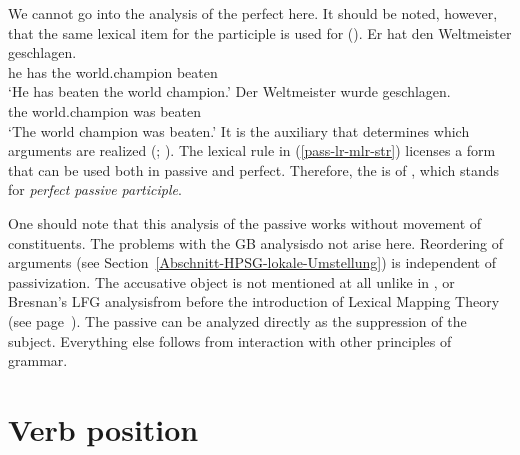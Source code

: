 We cannot go into the analysis of the perfect here. It should be noted, however, that the same lexical
item for the participle is
used for ().
\eal
\ex 
\gll Er hat den Weltmeister geschlagen.\\
	 he has the world.champion beaten\\
\glt `He has beaten the world champion.'
\ex 
\gll Der Weltmeister wurde geschlagen.\\
	 the world.champion was beaten\\
\glt `The world champion was beaten.'
\zl
It is the auxiliary that determines which arguments are realized (\citealp{Haider86}; \citealp[Chapter~17]{MuellerLehrbuch1}).
The lexical rule in (\ref{pass-lr-mlr-str}) licenses a form that can be used both in passive and perfect. Therefore, the
\vformv is of , which stands for \emph{perfect passive participle}.

One should note that this analysis of the passive works without movement of constituents. The problems with the GB analysis\indexgb do not arise here.
Reordering of arguments (see Section~\ref{Abschnitt-HPSG-lokale-Umstellung}) is independent of passivization. The accusative object is not mentioned
at all unlike in \gpsg, \cg or Bresnan's LFG analysis\indexlfg from before the introduction of
Lexical Mapping Theory (see page~\pageref{page-LMT}). The passive can be analyzed directly as the suppression of the subject. Everything else follows from interaction with other principles of grammar.
%
%

\section{Verb position}
\label{Abschnitt-Verbstellung-HPSG}

